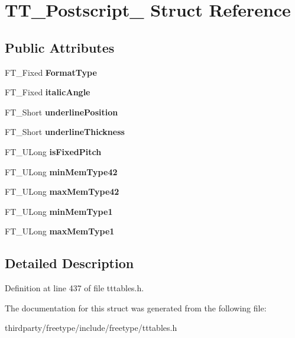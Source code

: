 \hypertarget{struct_t_t___postscript__}{}\section{T\+T\+\_\+\+Postscript\+\_\+ Struct Reference}
\label{struct_t_t___postscript__}
\subsection*{Public Attributes}
\begin{DoxyCompactItemize}
\item 
\mbox{\label{struct_t_t___postscript___a5ed6585c01fa4ffc3f8537d58bdd955f}} 
F\+T\+\_\+\+Fixed {\bfseries Format\+Type}
\item 
\mbox{\label{struct_t_t___postscript___adcca36c7fbcbdff00fc8c2884a215830}} 
F\+T\+\_\+\+Fixed {\bfseries italic\+Angle}
\item 
\mbox{\label{struct_t_t___postscript___a909fd5064ab7547bb8ed984b5dfe2fe2}} 
F\+T\+\_\+\+Short {\bfseries underline\+Position}
\item 
\mbox{\label{struct_t_t___postscript___a4e4654766a4f27054c9a35958515e186}} 
F\+T\+\_\+\+Short {\bfseries underline\+Thickness}
\item 
\mbox{\label{struct_t_t___postscript___ab9a537994be4f81cb35f61f83cd97949}} 
F\+T\+\_\+\+U\+Long {\bfseries is\+Fixed\+Pitch}
\item 
\mbox{\label{struct_t_t___postscript___ad78af4931654c197d4a8d0f04d473885}} 
F\+T\+\_\+\+U\+Long {\bfseries min\+Mem\+Type42}
\item 
\mbox{\label{struct_t_t___postscript___a70c4ba372d04e686208f0fede9885314}} 
F\+T\+\_\+\+U\+Long {\bfseries max\+Mem\+Type42}
\item 
\mbox{\label{struct_t_t___postscript___a91a8b40f60e67a1920209e6b08355848}} 
F\+T\+\_\+\+U\+Long {\bfseries min\+Mem\+Type1}
\item 
\mbox{\label{struct_t_t___postscript___a944a3df5127262db0f7ae92868defb99}} 
F\+T\+\_\+\+U\+Long {\bfseries max\+Mem\+Type1}
\end{DoxyCompactItemize}


\subsection{Detailed Description}


Definition at line 437 of file tttables.\+h.



The documentation for this struct was generated from the following file\+:\begin{DoxyCompactItemize}
\item 
thirdparty/freetype/include/freetype/tttables.\+h\end{DoxyCompactItemize}
